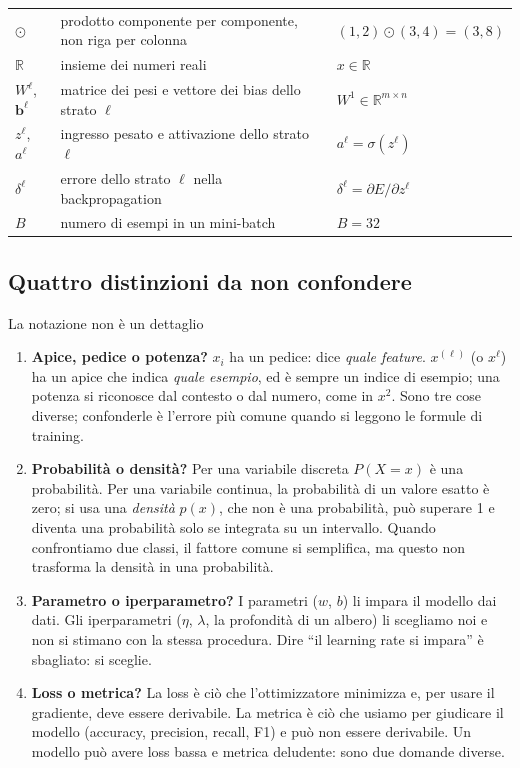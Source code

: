 \documentclass[12pt]{extarticle}
\begin{document}
\begin{longtable}[c]{@{}L{2.4cm}L{8.2cm}L{5.4cm}@{}}
$\odot$ & prodotto componente per componente, non riga per colonna & $(1,2)\odot(3,4)=(3,8)$ \\
$\mathbb{R}$ & insieme dei numeri reali & $x\in\mathbb{R}$ \\
$W^\ell$, $\mathbf{b}^\ell$ & matrice dei pesi e vettore dei bias dello strato $\ell$ & $W^1\in\mathbb{R}^{m\times n}$ \\
$z^\ell$, $a^\ell$ & ingresso pesato e attivazione dello strato $\ell$ & $a^\ell=\sigma(z^\ell)$ \\
$\delta^\ell$ & errore dello strato $\ell$ nella backpropagation & $\delta^\ell=\partial E/\partial z^\ell$ \\
$B$ & numero di esempi in un mini-batch & $B=32$ \\
\bottomrule
\end{longtable}
\endgroup

\newpage

\subsection*{Quattro distinzioni da non confondere}

\begin{attenzionebox}{La notazione non è un dettaglio}
\begin{enumerate}[1.]
    \item \textbf{Apice, pedice o potenza?} $x_i$ ha un pedice: dice \emph{quale feature}. $x^{(\ell)}$ (o $x^\ell$) ha un apice che indica \emph{quale esempio}, ed è sempre un indice di esempio; una potenza si riconosce dal contesto o dal numero, come in $x^2$. Sono tre cose diverse; confonderle è l'errore più comune quando si leggono le formule di training.
    \item \textbf{Probabilità o densità?} Per una variabile discreta $P(X=x)$ è una probabilità. Per una variabile continua, la probabilità di un valore esatto è zero; si usa una \emph{densità} $p(x)$, che non è una probabilità, può superare 1 e diventa una probabilità solo se integrata su un intervallo. Quando confrontiamo due classi, il fattore comune si semplifica, ma questo non trasforma la densità in una probabilità.
    \item \textbf{Parametro o iperparametro?} I parametri ($w$, $b$) li impara il modello dai dati. Gli iperparametri ($\eta$, $\lambda$, la profondità di un albero) li scegliamo noi e non si stimano con la stessa procedura. Dire ``il learning rate si impara'' è sbagliato: si sceglie.
    \item \textbf{Loss o metrica?} La loss è ciò che l'ottimizzatore minimizza e, per usare il gradiente, deve essere derivabile. La metrica è ciò che usiamo per giudicare il modello (accuracy, precision, recall, F1) e può non essere derivabile. Un modello può avere loss bassa e metrica deludente: sono due domande diverse.
\end{enumerate}
\end{attenzionebox}
\end{document}
